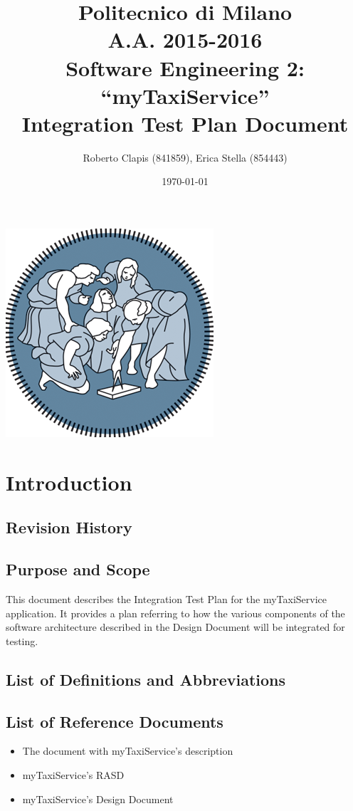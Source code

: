 \documentclass{article}
\author{Roberto Clapis (841859), Erica Stella (854443)}
\date{\today}
\title{Politecnico di Milano
	\\A.A. 2015\@-\@2016
	\\Software Engineering 2: ``myTaxiService''
	\\\textbf{I}ntegration \textbf{T}est \textbf{P}lan \textbf{D}ocument}
\begin{document}
\maketitle
\begin{center}
	\includegraphics{polimi-logo}
\end{center}
\clearpage
\tableofcontents
\clearpage
\section{Introduction}
\subsection{Revision History}
\subsection{Purpose and Scope}
This document describes the Integration Test Plan for the myTaxiService application. It provides a plan referring to how the various components of the software architecture described in the Design Document will be integrated for testing. 
\subsection{List of Definitions and Abbreviations}
\subsection{List of Reference Documents}
\begin{itemize}
	\item The document with myTaxiService's description
	\item myTaxiService's RASD
	\item myTaxiService's Design Document
\end{itemize}
\end{document}
